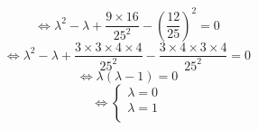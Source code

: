 \documentclass[solutions.tex]{subfiles}
\begin{document}
\[
	\Leftrightarrow \lambda^2 - \lambda +
		\frac{9\times16}{25^2} - \left(\frac{12}{25}\right)^2 = 0
\]
\[
	\Leftrightarrow \lambda^2 - \lambda +
		\frac{3\times3\times4\times4}{25^2}
		-\frac{3\times4\times3\times4}{25^2} = 0
\]
\[
	\Leftrightarrow \lambda(\lambda-1) = 0
\]
\[
	\Leftrightarrow \boxed{\begin{cases}
		\lambda = 0 \\
		\lambda = 1 \\
	\end{cases}}
\]
\end{document}
